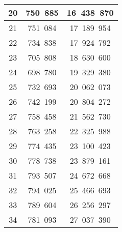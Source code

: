 \begin{center}
\begin{tabular}{|c|c|c|}
          20  &  750~885  &  16~438~870 \\ \hline
          21  &  751~084  &  17~189~954 \\ \hline
          22  &  734~838  &  17~924~792 \\ \hline
          23  &  705~808  &  18~630~600 \\ \hline
          24  &  698~780  &  19~329~380 \\ \hline
          25  &  732~693  &  20~062~073 \\ \hline
          26  &  742~199  &  20~804~272 \\ \hline
          27  &  758~458  &  21~562~730 \\ \hline
          28  &  763~258  &  22~325~988 \\ \hline
          29  &  774~435  &  23~100~423 \\ \hline
          30  &  778~738  &  23~879~161 \\ \hline
          31  &  793~507  &  24~672~668 \\ \hline
          32  &  794~025  &  25~466~693 \\ \hline
          33  &  789~604  &  26~256~297 \\ \hline
          34  &  781~093  &  27~037~390 \\ \hline
     \end{tabular}
\end{center}
\newpage
